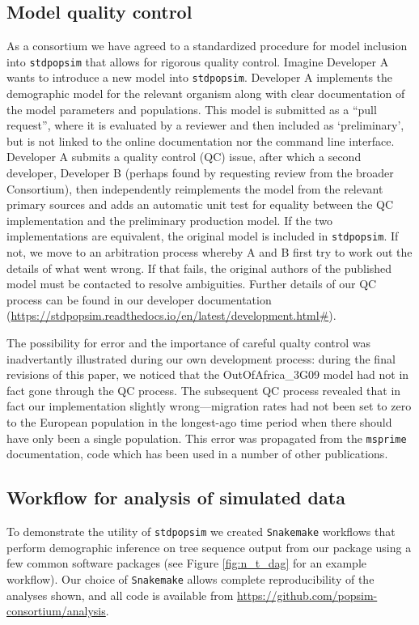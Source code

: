 \documentclass[12pt,halfline,a4paper]{ouparticle}
\newcommand{\stdpopsim}{\texttt{stdpopsim}\xspace}
\begin{document}
\subsection*{Model quality control}
As a consortium we have agreed to a standardized procedure for model inclusion
into \stdpopsim that allows for rigorous quality control. Imagine Developer A
wants to introduce a new model into \stdpopsim. Developer A implements the
demographic model for the relevant organism along with clear documentation
of the model parameters and populations. This model is submitted as a ``pull request'',
where it is evaluated by a reviewer and then included as `preliminary',
but is not linked to the online documentation nor the command line interface.
Developer A submits a quality control (QC) issue, after which a second developer,
Developer B (perhaps found by requesting review from the broader Consortium),
then independently reimplements the model from the relevant
primary sources and adds an automatic unit test for equality between the
QC implementation and the preliminary production model.
If the two implementations are equivalent, the original model is included in \stdpopsim.
If not, we move to an arbitration process whereby A and B first try
to work out the details of what went wrong. If that fails, the original
authors of the published model must be contacted
to resolve ambiguities.
Further details of our QC process can be found in our developer documentation
(\url{https://stdpopsim.readthedocs.io/en/latest/development.html#}).

The possibility for error and the importance of careful qualty control
was inadvertantly illustrated during our own development process:
during the final revisions of this paper, we noticed that the 
OutOfAfrica\_3G09 model \citep{gutenkunst2009inferring}
had not in fact gone through the QC process.
The subsequent QC process revealed that in fact our implementation
slightly wrong---migration rates had not been set to zero to the European population in the longest-ago time period
when there should have only been a single population.
This error was propagated from the \texttt{msprime} documentation,
code which has been used in a number of other publications.

\subsection*{Workflow for analysis of simulated data}
To demonstrate the utility of \stdpopsim we created \texttt{Snakemake}
workflows \citep{koster2012snakemake} that perform demographic inference on
tree sequence output from our package using a few common software packages (see Figure \ref{fig:n_t_dag} for an example workflow).
Our choice of \texttt{Snakemake} allows complete reproducibility of the
analyses shown, and all code is available from \url{https://github.com/popsim-consortium/analysis}.
\end{document}
